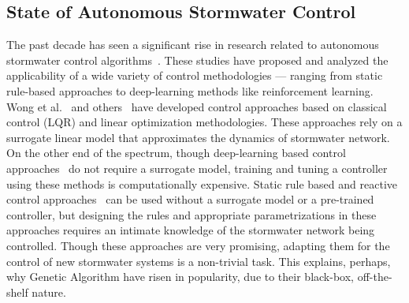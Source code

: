 \subsection{State of Autonomous Stormwater Control}
The past decade has seen a significant rise in research related to autonomous stormwater control algorithms~\cite{shishegar2018optimization}.
These studies have proposed and analyzed the applicability of a wide variety of control methodologies --- ranging from static rule-based approaches to deep-learning methods like reinforcement learning.
Wong et al.~\cite{Wong_Kerkez_2018} and others~\cite{Ocampo-Martinez_2015,joseph2014hybrid, Sun_2020, lund2020cso} have developed control approaches based on classical control (LQR) and linear optimization methodologies.
These approaches rely on a surrogate linear model that approximates the dynamics of stormwater network.
On the other end of the spectrum, though deep-learning based control approaches~\cite{Mullapudi_Lewis_Gruden_Kerkez_2020,Ochoa_Riano-Briceno_Quijano_Ocampo-Martinez_2019} do not require a surrogate model, training and tuning a controller using these methods is computationally expensive.
Static rule based\cite{schmitt2020simulation} and reactive control approaches~\cite{Troutman_2020} can be used without a surrogate model or a pre-trained controller, but designing the rules and appropriate parametrizations in these approaches requires an intimate knowledge of the stormwater network being controlled.
Though these approaches are very promising, adapting them for the control of new stormwater systems is a non-trivial task.
This explains, perhaps, why Genetic Algorithm have risen in popularity, due to their black-box, off-the-shelf nature. 


\

